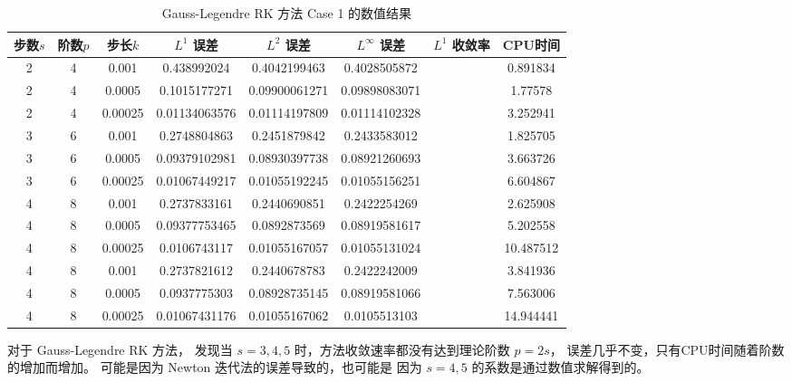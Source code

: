 \documentclass[a4paper]{article}
\begin{document}
\begin{table}[htbp]
    \centering
    \caption{Gauss-Legendre RK 方法 Case 1 的数值结果}
    \begin{tabular}{|c|c|c|c|c|c|c|c|}
        \hline
        步数$s$ & 阶数$p$ & 步长$k$ & $L^1$ 误差  & $L^2$ 误差 & $L^\infty$ 误差 & $L^1$ 收敛率 & CPU时间 \\
        \hline 
        2 & 4 & 0.001 &  0.438992024 & 0.4042199463 & 0.4028505872 & ~ &  0.891834  \\ 
        2 & 4 & 0.0005 & 0.1015177271 & 0.09900061271 & 0.09898083071 & ~ & 1.77578\\
        2 & 4 & 0.00025 & 0.01134063576 & 0.01114197809 &  0.01114102328 & ~ & 3.252941 \\
        \hline 
        3 & 6 & 0.001 &  0.2748804863 & 0.2451879842 & 0.2433583012 & ~ &  1.825705  \\ 
        3 & 6 & 0.0005 & 0.09379102981 & 0.08930397738 & 0.08921260693 & ~ & 3.663726\\
        3 & 6 & 0.00025 & 0.01067449217 & 0.01055192245 &  0.01055156251 & ~ & 6.604867 \\
        \hline
        4 & 8 & 0.001 &  0.2737833161 &  0.2440690851 & 0.2422254269 & ~ &  2.625908  \\ 
        4 & 8 & 0.0005 & 0.09377753465 & 0.0892873569 & 0.08919581617 & ~ & 5.202558\\
        4 & 8 & 0.00025 & 0.0106743117 & 0.01055167057 &  0.01055131024 & ~ & 10.487512 \\
        \hline
        4 & 8 & 0.001 &  0.2737821612 & 0.2440678783 & 0.2422242009 & ~ &  3.841936  \\ 
        4 & 8 & 0.0005 & 0.0937775303 & 0.08928735145 & 0.08919581066 & ~ & 7.563006\\
        4 & 8 & 0.00025 & 0.01067431176 & 0.01055167062 &  0.0105513103 & ~ & 14.944441 \\
        \hline  
    \end{tabular}
\end{table}

\par 对于 Gauss-Legendre RK 方法，
发现当 $s = 3,4,5$ 时，方法收敛速率都没有达到理论阶数 
$p = 2s$，
误差几乎不变，只有CPU时间随着阶数的增加而增加。
可能是因为 Newton 迭代法的误差导致的，也可能是
因为 $s = 4,5$ 的系数是通过数值求解得到的。
\end{document}
